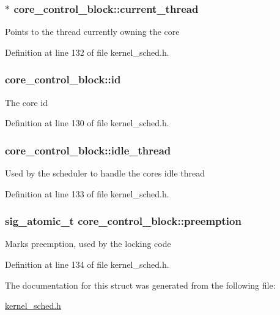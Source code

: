 \subsubsection[{\texorpdfstring{current\+\_\+thread}{current_thread}}]{$\ast$ core\+\_\+control\+\_\+block\+::current\+\_\+thread}\hypertarget{structcore__control__block_aac649db5b9a99e693ed21c7e610834bf}{}\label{structcore__control__block_aac649db5b9a99e693ed21c7e610834bf}
Points to the thread currently owning the core 

Definition at line 132 of file kernel\+\_\+sched.\+h.

\subsubsection[{\texorpdfstring{id}{id}}]{ core\+\_\+control\+\_\+block\+::id}\hypertarget{structcore__control__block_a5208867f309bdd1656fd473f38b30bfe}{}\label{structcore__control__block_a5208867f309bdd1656fd473f38b30bfe}
The core id 

Definition at line 130 of file kernel\+\_\+sched.\+h.

\subsubsection[{\texorpdfstring{idle\+\_\+thread}{idle_thread}}]{ core\+\_\+control\+\_\+block\+::idle\+\_\+thread}\hypertarget{structcore__control__block_a6dd29dab4a95ce740f45370345408c52}{}\label{structcore__control__block_a6dd29dab4a95ce740f45370345408c52}
Used by the scheduler to handle the core\textquotesingle{}s idle thread 

Definition at line 133 of file kernel\+\_\+sched.\+h.

\subsubsection[{\texorpdfstring{preemption}{preemption}}]{\setlength{\rightskip}{0pt plus 5cm}sig\+\_\+atomic\+\_\+t core\+\_\+control\+\_\+block\+::preemption}\hypertarget{structcore__control__block_a858cde45d4478d73f60e839594b363f4}{}\label{structcore__control__block_a858cde45d4478d73f60e839594b363f4}
Marks preemption, used by the locking code 

Definition at line 134 of file kernel\+\_\+sched.\+h.



The documentation for this struct was generated from the following file\+:\begin{DoxyCompactItemize}
\item 
\hyperlink{kernel__sched_8h}{kernel\+\_\+sched.\+h}\end{DoxyCompactItemize}
